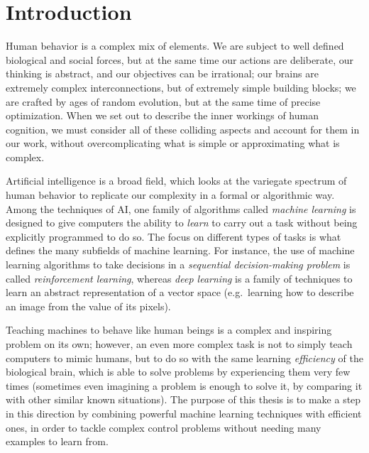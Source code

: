 \chapter{Introduction}
\label{ch1_intro}
\thispagestyle{empty}

\vspace{0.5cm}
 
Human behavior is a complex mix of elements. We are subject to 
well defined biological and social forces, but at the same time our actions are 
deliberate, our thinking is abstract, and our objectives can be irrational; 
our brains are extremely complex interconnections, but of extremely simple 
building blocks; we are crafted by ages of random evolution, but at the same 
time of precise optimization. 
When we set out to describe the inner workings of human cognition, we must 
consider all of these colliding aspects and account for them in our work, 
without overcomplicating what is simple or approximating what is complex.

Artificial intelligence is a broad field, which looks at the variegate spectrum 
of human behavior to replicate our complexity in a formal or algorithmic way. 
Among the techniques of AI, one family of algorithms called \textit{machine
learning} is designed to give computers the ability to \textit{learn} to carry 
out a task without being explicitly programmed to do so. 
The focus on different types of tasks is what defines the many subfields of 
machine learning.
For instance, the use of machine learning algorithms to take decisions in a 
\textit{sequential decision-making problem} is called \textit{reinforcement 
learning}, whereas \textit{deep learning} is a family of techniques to learn an 
abstract representation of a vector space (e.g.\, learning how to describe an
image from the value of its pixels).

Teaching machines to behave like human beings is a complex and inspiring problem
on its own; however, an even more complex task is not to simply teach 
computers to mimic humans, but to do so with the same learning 
\textit{efficiency} of the biological brain, which is able to solve problems by
experiencing them very few times (sometimes even imagining a problem is enough 
to solve it, by comparing it with other similar known situations). 
The purpose of this thesis is to make a step in this direction by
combining powerful machine learning techniques with efficient ones, in order
to tackle complex control problems without needing many examples to learn
from.

